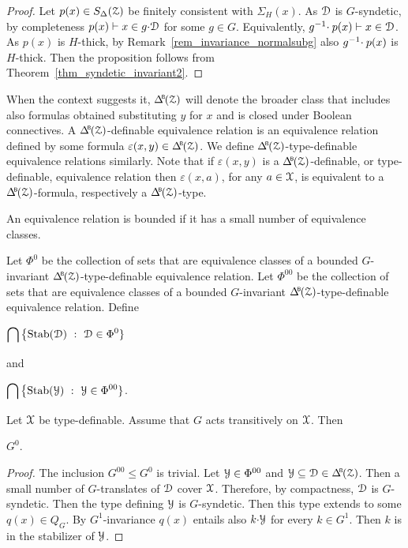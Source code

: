\begin{proof}
  Let $p(x)\in S_\Delta(\EuScript Z)$ be finitely consistent with $\Sigma_H(x)$.
  As $\EuScript D$ is $G$-syndetic, by completeness $p(x)\vdash x\in g{\cdot}\EuScript D$ for some $g\in G$.
  Equivalently, $g^{-1}\kern-.5ex\cdot p(x)\vdash x\in\EuScript D$.
  As $p(x)$ is $H$-thick, by Remark~\ref{rem_invariance_normalsubg} also $g^{-1}\kern-.5ex\cdot p(x)$ is $H$-thick.
  Then the proposition follows from Theorem~\ref{thm_syndetic_invariant2}.
\end{proof}

When the context suggests it, $\BDelta(\Z)$ will denote the broader class that includes also formulas obtained substituting $y$ for $x$ and is closed under Boolean connectives.
A $\BDelta(\Z)$-definable equivalence relation is an equivalence relation defined by some formula $\varepsilon(x,y)\in\BDelta(\Z)$.
We define $\BDelta(\Z)$-type-definable equivalence relations similarly.
Note that if $\varepsilon(x,y)$ is a $\BDelta(\Z)$-definable, or type-definable, equivalence relation then $\varepsilon(x,a)$, for any $a\in\EuScript X$, is equivalent to a $\BDelta(\Z)$-formula, respectively a $\BDelta(\Z)$-type.

An equivalence relation is bounded if it has a small number of equivalence classes.

\begin{definition}\label{def_G00}
  Let $\Phi^0$ be the collection of sets that are equivalence classes of a bounded $G$-invariant $\BDelta(\Z)$-type-definable equivalence relation.
  Let $\Phi^{00}$ be the collection of sets that are equivalence classes of a bounded $G$-invariant $\BDelta(\Z)$-type-definable equivalence relation.
  Define
  \smallskip

  \medrel{=}$\displaystyle\bigcap\big\{{\rm Stab}(\D)\ :\  \D\in\Phi^0\}$

  and

  \medrel{=}$\displaystyle\bigcap\big\{{\rm Stab}(\Y)\ :\  \Y\in\Phi^{00}\}$.

\end{definition}

\begin{proposition}
  Let $\EuScript X$ be type-definable.
  Assume that $G$ acts transitively on $\EuScript X$.
  Then 
  
  \medrel{\leq}$G^0$.
\end{proposition}

\begin{proof}
  The inclusion $G^{00}\leq G^0$ is trivial.
  Let $\EuScript Y\in\Phi^{00}$ and $\Y\subseteq\D\in\BDelta(\Z)$.
  Then a small number of $G$-translates of $\EuScript D$ cover $\EuScript X$.
  Therefore, by compactness, $\EuScript D$ is $G$-syndetic.
  Then the type defining $\EuScript Y$ is $G$-syndetic.
  Then this type extends to some $q(x)\in Q_G$.
  By $G^1$-invariance $q(x)$ entails also $k{\cdot}\EuScript Y$ for every $k\in G^1$.
  Then $k$ is in the stabilizer of $\EuScript Y$.
\end{proof}

